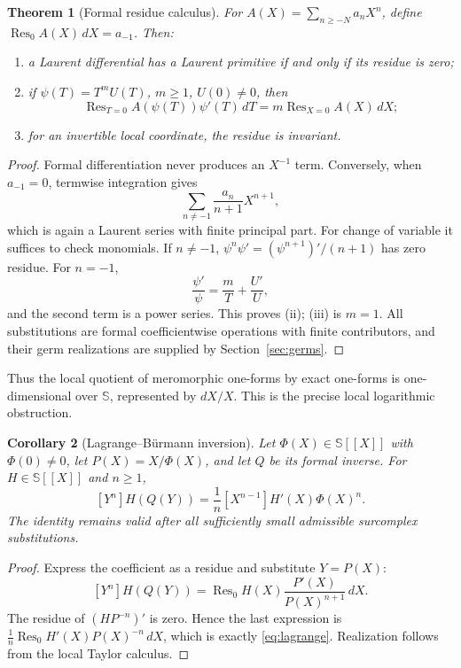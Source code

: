 \documentclass[11pt,a4paper]{article}
\newtheorem{theorem}{Theorem}[section]
\newtheorem{corollary}[theorem]{Corollary}
\theoremstyle{definition}
\theoremstyle{remark}
\newcommand{\SC}{\mathbb S}
\newcommand{\Res}{\operatorname{Res}}
\begin{document}
\begin{theorem}[Formal residue calculus]\label{thm:formalres}
For $A(X)=\sum_{n\ge-N}a_nX^n$, define
$\Res_0 A(X)\,dX=a_{-1}$. Then:
\begin{enumerate}[label=(\roman*)]
\item a Laurent differential has a Laurent primitive if and only if
its residue is zero;
\item if $\psi(T)=T^mU(T)$, $m\ge1$, $U(0)\ne0$, then
\[
 \Res_{T=0}A(\psi(T))\psi'(T)\,dT
      =m\Res_{X=0}A(X)\,dX;
\]
\item for an invertible local coordinate, the residue is invariant.
\end{enumerate}
\end{theorem}
\begin{proof}
Formal differentiation never produces an $X^{-1}$ term. Conversely,
when $a_{-1}=0$, termwise integration gives
\[
 \sum_{n\ne-1}\frac{a_n}{n+1}X^{n+1},
\]
which is again a Laurent series with finite principal part.
For change of variable it suffices to check monomials. If $n\ne-1$,
$\psi^n\psi'=(\psi^{n+1})'/(n+1)$ has zero residue. For $n=-1$,
\[
 \frac{\psi'}\psi=\frac mT+\frac{U'}U,
\]
and the second term is a power series. This proves (ii); (iii) is
$m=1$. All substitutions are formal coefficientwise operations with
finite contributors, and their germ realizations are supplied by
Section~\ref{sec:germs}.
\end{proof}
Thus the local quotient of meromorphic one-forms by exact one-forms
is one-dimensional over $\SC$, represented by $dX/X$. This is the
precise local logarithmic obstruction.

\begin{corollary}[Lagrange--B\"urmann inversion]\label{cor:lagrange}
Let $\Phi(X)\in\SC[[X]]$ with $\Phi(0)\ne0$, let
$P(X)=X/\Phi(X)$, and let $Q$ be its formal inverse. For
$H\in\SC[[X]]$ and $n\ge1$,
\begin{equation}\label{eq:lagrange}
 [Y^n]H(Q(Y))=\frac1n[X^{n-1}]H'(X)\Phi(X)^n.
\end{equation}
The identity remains valid after all sufficiently small admissible
surcomplex substitutions.
\end{corollary}
\begin{proof}
Express the coefficient as a residue and substitute $Y=P(X)$:
\[
 [Y^n]H(Q(Y))=
 \Res_0 H(X)\frac{P'(X)}{P(X)^{n+1}}\,dX.
\]
The residue of $(H P^{-n})'$ is zero. Hence the last expression is
$\frac1n\Res_0 H'(X)P(X)^{-n}\,dX$, which is exactly
\eqref{eq:lagrange}. Realization follows from the local Taylor
calculus.
\end{proof}
\end{document}

